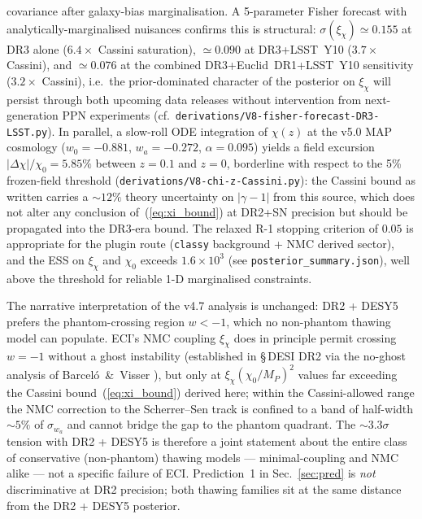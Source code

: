 \begin{enumerate}
  covariance after galaxy-bias marginalisation. A 5-parameter Fisher
  forecast with analytically-marginalised nuisances confirms this is
  structural: $\sigma(\xi_\chi)\simeq 0.155$ at DR3 alone
  ($6.4\times$ Cassini saturation), $\simeq 0.090$ at DR3+LSST~Y10
  ($3.7\times$ Cassini), and $\simeq 0.076$ at the combined
  DR3+Euclid~DR1+LSST~Y10 sensitivity ($3.2\times$ Cassini),
  i.e.\ the prior-dominated character of the posterior on $\xi_\chi$
  will persist through both upcoming data releases without
  intervention from next-generation PPN experiments
  (cf.\ \texttt{derivations/V8-fisher-forecast-DR3-LSST.py}).
  In parallel, a slow-roll ODE integration of
  $\chi(z)$ at the v5.0 MAP cosmology
  ($w_0=-0.881$, $w_a=-0.272$, $\alpha=0.095$) yields a field
  excursion $|\Delta\chi|/\chi_0 = 5.85\%$ between $z=0.1$ and
  $z=0$, borderline with respect to the 5\% frozen-field threshold
  (\texttt{derivations/V8-chi-z-Cassini.py}): the Cassini bound as
  written carries a $\sim 12\%$ theory uncertainty on $|\gamma-1|$
  from this source, which does not alter any conclusion
  of~(\ref{eq:xi_bound}) at DR2+SN precision but should be propagated
  into the DR3-era bound. The relaxed R-1 stopping
  criterion of $0.05$ is appropriate for the plugin route (\texttt{classy}
  background + NMC derived sector), and the ESS on $\xi_\chi$ and $\chi_0$
  exceeds $1.6\times 10^3$ (see \texttt{posterior\_summary.json}), well above the
  threshold for reliable 1-D marginalised constraints.

  The narrative interpretation of the v4.7 analysis is unchanged: DR2 + DESY5 prefers the
  phantom-crossing region $w<-1$, which no non-phantom thawing model can populate.
  ECI's NMC coupling $\xi_\chi$ does in principle permit crossing $w=-1$ without a ghost
  instability (established in \S\,DESI DR2 via the no-ghost analysis of Bar\-ce\-l\'o~\&~Visser
  \cite{BarceloVisser2000}), but only at $\xi_\chi(\chi_0/M_P)^2$ values far exceeding the
  Cassini bound~(\ref{eq:xi_bound}) derived here; within the Cassini-allowed range
  the NMC correction to the Scherrer--Sen track is confined to a band of half-width
  $\sim\!5\%$ of $\sigma_{w_a}$ and cannot bridge the gap to the phantom quadrant. The
  $\sim\!3.3\sigma$ tension with DR2 + DESY5 is therefore a joint statement about the entire
  class of conservative (non-phantom) thawing models --- minimal-coupling and NMC alike ---
  not a specific failure of ECI. Prediction~1 in Sec.~\ref{sec:pred} is \emph{not}
  discriminative at DR2 precision; both thawing families sit at the same distance from
  the DR2 + DESY5 posterior.


\end{enumerate}

